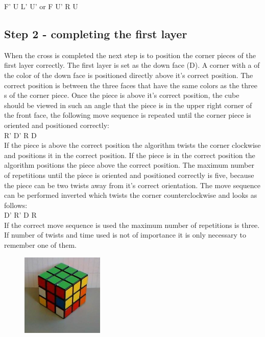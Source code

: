 F' U L' U' or F U' R U

\subsection{Step 2 - completing the first layer}
When the cross is completed the next step is to position the corner pieces of the first layer correctly. The first layer is set as the down face (D). A corner with a \facet{} of the color of the down face is positioned directly above it's correct  position. The correct position is between the three faces that have the same colors as the three \facet{}s of the corner piece. Once the piece is above it's correct position, the cube should be viewed in such an angle that the piece is in the upper right corner of the front face, the following move sequence is repeated until the corner piece is oriented and positioned correctly: \\

R' D' R D \\

If the piece is above the correct position the algorithm twists the corner clockwise and positions it in the correct position. If the piece is in the correct position the algorithm positions the piece above the correct position. The maximum number of repetitions until the piece is oriented and positioned correctly is five, because the piece can be two twists away from it's correct orientation. 
The move sequence can be performed inverted which twists the corner counterclockwise and looks as follows: \\

D' R' D R \\

If the correct move sequence is used the maximum number of repetitions is three. If number of twists and time used is not of importance it is only necessary to remember one of them.

\begin{figure}
\begin{center}
	\includegraphics[width=0.35\textwidth]{input/pics/2FL.jpg}	
\end{center}
\caption{}
\label{fig:2FL}
\end{figure}

